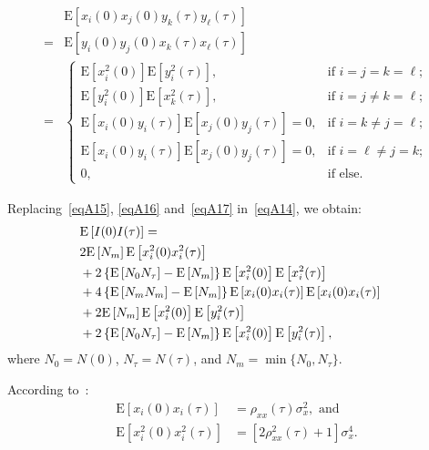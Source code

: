 \documentclass[journal]{IEEEtran}
\begin{document}
\begin{align}
& \mathrm{E}\left[x_{i}(0) x_{j}(0) y_{k}(\tau) y_{\ell}(\tau)\right] \nonumber \\
={} & \mathrm{E}\left[y_{i}(0) y_{j}(0) x_{k}(\tau) x_{\ell}(\tau)\right] \nonumber \\
={} & \begin{cases}
\mathrm{E}\left[x_{i}^{2}(0)\right]\mathrm{E}\left[y_{i}^{2}(\tau)\right], & \text{if } i=j=k=\ell; \\
\mathrm{E}\left[y_{i}^{2}(0)\right] \mathrm{E}\left[x_{k}^{2}(\tau)\right], & \text{if } i=j \neq k=\ell; \\
\mathrm{E}\left[x_{i}(0) y_{i}(\tau)\right] \mathrm{E}\left[x_{j}(0) y_{j}(\tau)\right] = 0, &  \text{if } i=k \neq j=\ell; \\
\mathrm{E}\left[x_{i}(0) y_{i}(\tau)\right] \mathrm{E}\left[x_{j}(0) y_{j}(\tau)\right] = 0, &  \text{if } i=\ell \neq j=k; \\
0, & \text{if } \text {else}.
\end{cases}\label{eqA17}
\end{align}

Replacing~\eqref{eqA15}, \eqref{eqA16} and~\eqref{eqA17} in~\eqref{eqA14}, we obtain:
\begin{equation}
\begin{split}
\lefteqn{\mathrm{E}\left[ I(0)I(\tau) \right]= {}}  \\
& 2 \mathrm{E}\left[N_{m}\right]\mathrm{E}\left[x_{i}^{2}(0)x_{i}^{2}(\tau)\right] \\
& {} + 2 \left\{\mathrm{E}\left[ N_{0}N_{\tau}\right]-\mathrm{E}\left[N_{m}\right]\right\}\mathrm{E} \left[x_{i}^{2}(0)\right] \mathrm{E}\left[x_{i}^{2}(\tau)\right] \\
& {}+ 4 \left\{\mathrm{E}\left[N_{m} N_{m}\right]-\mathrm{E}\left[N_{m}\right] \right\}\mathrm{E}\left[x_{i}(0)x_{i}(\tau)\right]\mathrm{E} \left[x_{i}(0)x_{i}(\tau)\right] \\
& {} + 2 \mathrm{E}\left[N_{m}\right]\mathrm{E}\left[x_{i}^{2}(0)\right] \mathrm{E}\left[y_{i}^{2}(\tau)\right] \\
& {} + 2 \left\{\mathrm{E}\left[N_{0}N_{\tau}\right]-\mathrm{E}\left[N_{m}\right] \right\}\mathrm{E}\left[x_{i}^{2}(0)\right] \mathrm{E}\left[y_{i}^{2}(\tau)\right],
\label{eqA18}
\end{split}
\end{equation}
where $N_{0} = N(0)$, $N_{\tau} = N(\tau)$, and $N_{m} = \min\{N_{0},N_{\tau}\}$.

According to~\cite{Papoulis:2002}:
\begin{equation}
\begin{split}
\mathrm{E}\left[x_{i}(0) x_{i}(\tau) \right] & = \rho_{x x}(\tau) \sigma_{x}^{2},  \text{ and}\\
\mathrm{E}\left[x_{i}^{2}(0) x_{i}^{2}(\tau) \right] & = \left[2\rho_{x x}^{2}(\tau) + 1\right] \sigma_{x}^{4}.
\label{eqA19}
\end{split}
\end{equation}
\end{document}

